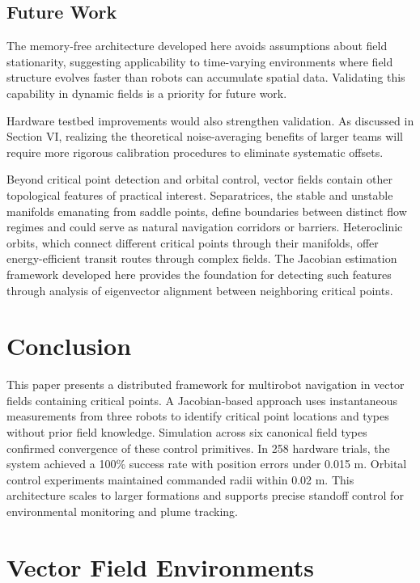 \documentclass[lettersize,journal]{IEEEtran}
\begin{document}
\subsection{Future Work}

The memory-free architecture developed here avoids assumptions about field stationarity, suggesting applicability to time-varying environments where field structure evolves faster than robots can accumulate spatial data. Validating this capability in dynamic fields is a priority for future work.

Hardware testbed improvements would also strengthen validation. As discussed in Section VI, realizing the theoretical noise-averaging benefits of larger teams will require more rigorous calibration procedures to eliminate systematic offsets.

Beyond critical point detection and orbital control, vector fields contain other topological features of practical interest. Separatrices, the stable and unstable manifolds emanating from saddle points, define boundaries between distinct flow regimes and could serve as natural navigation corridors or barriers. Heteroclinic orbits, which connect different critical points through their manifolds, offer energy-efficient transit routes through complex fields. The Jacobian estimation framework developed here provides the foundation for detecting such features through analysis of eigenvector alignment between neighboring critical points.


\section{Conclusion}
\noindent

This paper presents a distributed framework for multirobot navigation in vector fields containing critical points. A Jacobian-based approach uses instantaneous measurements from three robots to identify critical point locations and types without prior field knowledge. Simulation across six canonical field types confirmed convergence of these control primitives. 
In 258 hardware trials, the system achieved a 100\% success rate with position errors under 0.015 m. Orbital control experiments maintained commanded radii within 0.02 m. This architecture scales to larger formations and supports precise standoff control for environmental monitoring and plume tracking.


\appendices

\section{Vector Field Environments}
\label{sec:appendix_vector_fields}
\end{document}
